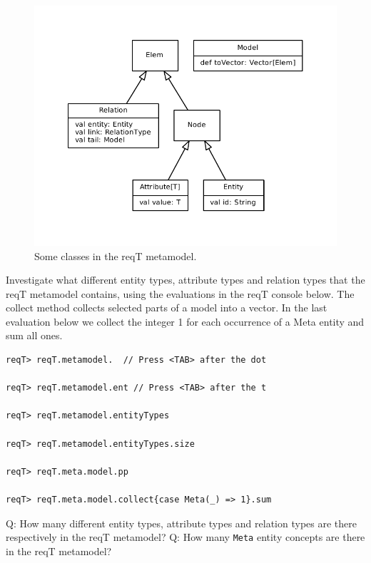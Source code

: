 \documentclass[11pt]{article}
\begin{document}
\begin{figure}[h]
    \centering
    \includegraphics[width=\textwidth]{metamodel-simple.pdf}
    \caption{Some classes in the reqT metamodel.}
    \label{fig:metamodel}
\end{figure}

Investigate what different entity types, attribute types and relation types that the reqT metamodel contains, using the evaluations in the reqT console below. The collect method collects selected parts of a model into a vector. In the last evaluation below we collect the integer 1 for each occurrence of a Meta entity and sum all ones.

{\footnotesize\begin{verbatim}
reqT> reqT.metamodel.  // Press <TAB> after the dot

reqT> reqT.metamodel.ent // Press <TAB> after the t

reqT> reqT.metamodel.entityTypes

reqT> reqT.metamodel.entityTypes.size

reqT> reqT.meta.model.pp

reqT> reqT.meta.model.collect{case Meta(_) => 1}.sum
\end{verbatim}}

\begin{framed}\noindent
Q: How many different entity types, attribute types and relation types are there respectively in the reqT metamodel? 
\newline
\newline \underline{\hspace{11.9cm}}
\newline\newline
Q: How many \verb+Meta+ entity concepts are there in the reqT metamodel? 
\newline
\newline \underline{\hspace{11.9cm}}
\end{framed}
\end{document}
